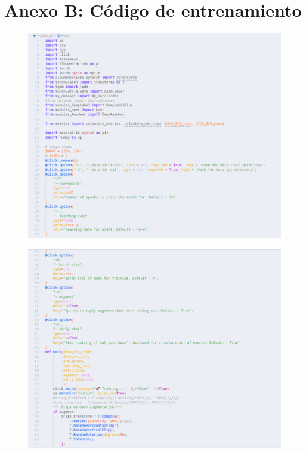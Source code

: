 \section*{Anexo B: Código de entrenamiento}

\begin{figure}[h!]
	\centering
	\includegraphics[width=0.9\linewidth]{graficos/entrenamiento}
\end{figure}

\begin{figure}[h!]
	\centering
	\includegraphics[width=0.9\linewidth]{graficos/entrenamiento2}
\end{figure}

